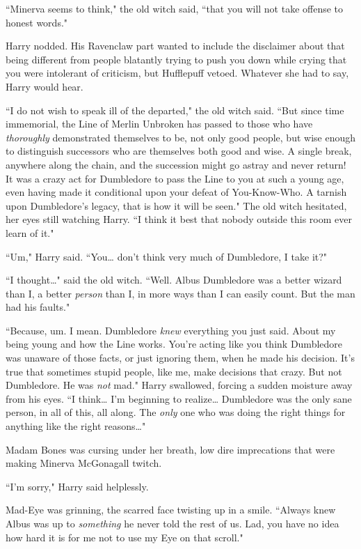 ``Minerva seems to think," the old witch said, ``that you will not take offense to honest words."

Harry nodded. His Ravenclaw part wanted to include the disclaimer about that being different from people blatantly trying to push you down while crying that you were intolerant of criticism, but Hufflepuff vetoed. Whatever she had to say, Harry would hear.

``I do not wish to speak ill of the departed," the old witch said. ``But since time immemorial, the Line of Merlin Unbroken has passed to those who have \emph{thoroughly} demonstrated themselves to be, not only good people, but wise enough to distinguish successors who are themselves both good and wise. A single break, anywhere along the chain, and the succession might go astray and never return! It was a crazy act for Dumbledore to pass the Line to you at such a young age, even having made it conditional upon your defeat of You-Know-Who. A tarnish upon Dumbledore's legacy, that is how it will be seen." The old witch hesitated, her eyes still watching Harry. ``I think it best that nobody outside this room ever learn of it."

``Um," Harry said. ``You{\ldots} don't think very much of Dumbledore, I take it?"

``I thought{\ldots}" said the old witch. ``Well. Albus Dumbledore was a better wizard than I, a better \emph{person} than I, in more ways than I can easily count. But the man had his faults."

``Because, um. I mean. Dumbledore \emph{knew} everything you just said. About my being young and how the Line works. You're acting like you think Dumbledore was unaware of those facts, or just ignoring them, when he made his decision. It's true that sometimes stupid people, like me, make decisions that crazy. But not Dumbledore. He was \emph{not} mad." Harry swallowed, forcing a sudden moisture away from his eyes. ``I think{\ldots} I'm beginning to realize{\ldots} Dumbledore was the only sane person, in all of this, all along. The \emph{only} one who was doing the right things for anything like the right reasons{\ldots}"

Madam Bones was cursing under her breath, low dire imprecations that were making Minerva McGonagall twitch.

``I'm sorry," Harry said helplessly.

Mad-Eye was grinning, the scarred face twisting up in a smile. ``Always knew Albus was up to \emph{something} he never told the rest of us. Lad, you have no idea how hard it is for me not to use my Eye on that scroll."

